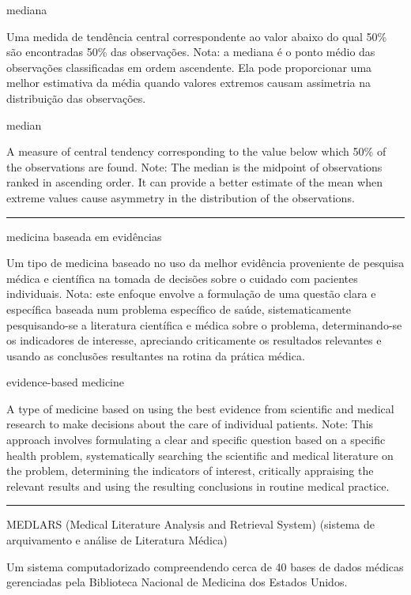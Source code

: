 \documentclass[
  openany]{book}
\begin{document}
mediana

Uma medida de tendência central correspondente ao valor abaixo do qual 50\% são encontradas 50\% das observações. Nota: a mediana é o ponto médio das observações classificadas em ordem ascendente. Ela pode proporcionar uma melhor estimativa da média quando valores extremos causam assimetria na distribuição das observações.

median

A measure of central tendency corresponding to the value below which 50\% of the observations are found. Note: The median is the midpoint of observations ranked in ascending order. It can provide a better estimate of the mean when extreme values cause asymmetry in the distribution of the observations.

\begin{center}\rule{0.5\linewidth}{0.5pt}\end{center}

medicina baseada em evidências

Um tipo de medicina baseado no uso da melhor evidência proveniente de pesquisa médica e científica na tomada de decisões sobre o cuidado com pacientes individuais. Nota: este enfoque envolve a formulação de uma questão clara e específica baseada num problema específico de saúde, sistematicamente pesquisando-se a literatura científica e médica sobre o problema, determinando-se os indicadores de interesse, apreciando criticamente os resultados relevantes e usando as conclusões resultantes na rotina da prática médica.

evidence-based medicine

A type of medicine based on using the best evidence from scientific and medical research to make decisions about the care of individual patients. Note: This approach involves formulating a clear and specific question based on a specific health problem, systematically searching the scientific and medical literature on the problem, determining the indicators of interest, critically appraising the relevant results and using the resulting conclusions in routine medical practice.

\begin{center}\rule{0.5\linewidth}{0.5pt}\end{center}

MEDLARS (Medical Literature Analysis and Retrieval System) (sistema de arquivamento e análise de Literatura Médica)

Um sistema computadorizado compreendendo cerca de 40 bases de dados médicas gerenciadas pela Biblioteca Nacional de Medicina dos Estados Unidos.
\end{document}
